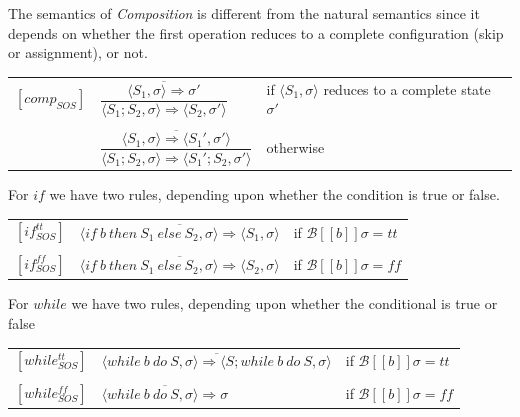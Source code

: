 \documentclass[11pt,a4paper]{article}
\begin{document}
The semantics of \textit{Composition} is different from the natural semantics since it depends on whether the first operation reduces to a complete configuration (skip or assignment), or not.\\
\begin{center}
\begin{tabular}{rll}
$[comp_{SOS}]$&$\dfrac{\overline{\langle S_1,\sigma\rangle\Rightarrow\sigma'}}{\langle S_1;S_2,\sigma\rangle\Rightarrow\langle S_2,\sigma'\rangle}$&if $\langle S_1,\sigma\rangle$ reduces to a complete state $\sigma'$\\\\
&$\dfrac{\overline{\langle S_1,\sigma\rangle\Rightarrow\langle S_1',\sigma'\rangle}}{\langle S_1;S_2,\sigma\rangle\Rightarrow\langle S_1';S_2,\sigma'\rangle}$&otherwise\\
\end{tabular}
\end{center}

For $if$ we have two rules, depending upon whether the condition is true or false.\\
\begin{center}
\begin{tabular}{rll}
$[if_{SOS}^{tt}]$&$\overline{\langle if\ b\ then\ S_1\ else\ S_2,\sigma\rangle\Rightarrow\langle S_1,\sigma\rangle}$&if $\mathcal{B}[[b]]\sigma=tt$\\\\
$[if_{SOS}^{ff}]$&$\overline{\langle if\ b\ then\ S_1\ else\ S_2,\sigma\rangle\Rightarrow\langle S_2,\sigma\rangle}$&if $\mathcal{B}[[b]]\sigma=ff$
\end{tabular}
\end{center}

For $while$ we have two rules, depending upon whether the conditional is true or false
\begin{center}
\begin{tabular}{rll}
$[while_{SOS}^{tt}]$&$\overline{\langle while\ b\ do\ S,\sigma\rangle\Rightarrow\langle S;while\ b\ do\ S,\sigma\rangle}$&if $\mathcal{B}[[b]]\sigma=tt$\\\\
$[while_{SOS}^{ff}]$&$\overline{\langle while\ b\ do\ S,\sigma\rangle\Rightarrow\sigma}$&if $\mathcal{B}[[b]]\sigma=ff$
\end{tabular}
\end{center}
\end{document}
